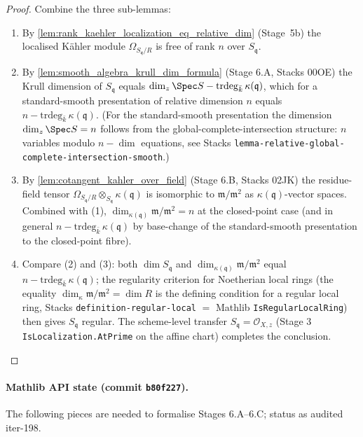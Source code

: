 \begin{proof}
  Combine the three sub-lemmas:
  \begin{enumerate}
    \item By \cref{lem:rank_kaehler_localization_eq_relative_dim} (Stage~5b)
      the localised K\"ahler module \(\Omega_{S_{\mathfrak q} / R}\)
      is free of rank \(n\) over \(S_{\mathfrak q}\).
    \item By \cref{lem:smooth_algebra_krull_dim_formula} (Stage 6.A,
      Stacks 00OE) the Krull dimension of \(S_{\mathfrak q}\) equals
      \(\dim_z \Spec S - \mathrm{trdeg}_{\bar k}\,\kappa(\mathfrak q)\),
      which for a standard-smooth presentation of relative dimension
      \(n\) equals \(n - \mathrm{trdeg}_{\bar k}\,\kappa(\mathfrak q)\).
      (For the standard-smooth presentation the dimension
      \(\dim_z \Spec S = n\) follows from the global-complete-intersection
      structure: \(n\) variables modulo \(n - \dim\) equations, see
      Stacks \texttt{lemma-relative-global-complete-intersection-smooth}.)
    \item By \cref{lem:cotangent_kahler_over_field} (Stage 6.B,
      Stacks 02JK) the residue-field tensor \(\Omega_{S_{\mathfrak q}/R}
      \otimes_{S_{\mathfrak q}} \kappa(\mathfrak q)\) is isomorphic to
      \(\mathfrak m / \mathfrak m^2\) as \(\kappa(\mathfrak q)\)-vector
      spaces. Combined with (1), \(\dim_{\kappa(\mathfrak q)} \mathfrak
      m / \mathfrak m^2 = n\) at the closed-point case (and in general
      \(n - \mathrm{trdeg}_{\bar k}\,\kappa(\mathfrak q)\) by base-change
      of the standard-smooth presentation to the closed-point fibre).
    \item Compare (2) and (3): both \(\dim S_{\mathfrak q}\) and
      \(\dim_{\kappa(\mathfrak q)} \mathfrak m / \mathfrak m^2\) equal
      \(n - \mathrm{trdeg}_{\bar k}\,\kappa(\mathfrak q)\); the
      regularity criterion for Noetherian local rings (the equality
      \(\dim_\kappa \mathfrak m / \mathfrak m^2 = \dim R\) is the
      defining condition for a regular local ring, Stacks
      \texttt{definition-regular-local} \(=\) Mathlib
      \texttt{IsRegularLocalRing}) then gives \(S_{\mathfrak q}\)
      regular. The scheme-level transfer
      \(S_{\mathfrak q} = \mathcal O_{X, z}\) (Stage 3
      \texttt{IsLocalization.AtPrime} on the affine chart) completes
      the conclusion.
  \end{enumerate}
\end{proof}

\paragraph{Mathlib API state (commit \texttt{b80f227}).} The following
pieces are needed to formalise Stages 6.A--6.C; status as audited iter-198.

